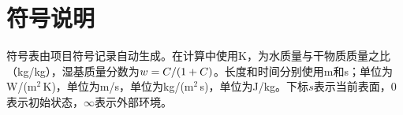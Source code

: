 \section{符号说明}

符号表由项目符号记录自动生成。\T{}在计算中使用K，\C{}为水质量与干物质质量之比（kg/kg），湿基质量分数为$w=C/(1+C)$。长度和时间分别使用m和s；\hconv{}单位为W/(m$^2$\,K)，\hmass{}单位为m/s，\jvap{}单位为kg/(m$^2$\,s)，\Lvap{}单位为J/kg。下标$s$表示当前表面，$0$表示初始状态，$\infty$表示外部环境。
